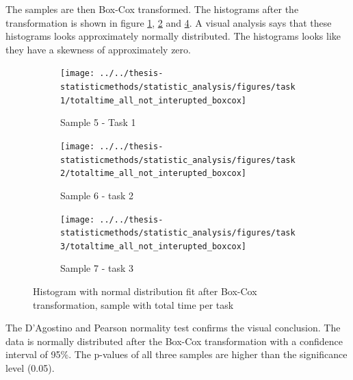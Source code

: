 The samples are then Box-Cox transformed. The histograms after the transformation is shown in figure \ref{fig:totaltimeallnotinteruptedboxcox_task1}, \ref{fig:totaltimeallnotinteruptedboxcox_task2} and \ref{fig:totaltimeallnotinteruptedboxcox_task3}. A visual analysis says that these histograms looks approximately normally distributed. The histograms looks like they have a skewness of approximately zero. 

\begin{figure}[h!]
	\centering
	\begin{subfigure}[b]{0.3\textwidth}
		\centering
		\texttt{[image: ../../thesis-statisticmethods/statistic\_analysis/figures/task1/totaltime\_all\_not\_interupted\_boxcox]}
		\caption{Sample 5 - Task 1}
		\label{fig:totaltimeallnotinteruptedboxcox_task1}
	\end{subfigure}
	\begin{subfigure}[b]{0.3\textwidth}
		\centering
		\texttt{[image: ../../thesis-statisticmethods/statistic\_analysis/figures/task2/totaltime\_all\_not\_interupted\_boxcox]}
		\caption{Sample 6 - task 2}
		\label{fig:totaltimeallnotinteruptedboxcox_task2}
	\end{subfigure}
	\begin{subfigure}[b]{0.3\textwidth}
		\centering
		\texttt{[image: ../../thesis-statisticmethods/statistic\_analysis/figures/task3/totaltime\_all\_not\_interupted\_boxcox]}
		\caption{Sample 7 - task 3}
		\label{fig:totaltimeallnotinteruptedboxcox_task3}
	\end{subfigure}
	\caption{Histogram with normal distribution fit after Box-Cox transformation, sample with total time per task}
\end{figure}

The D'Agostino and Pearson normality test confirms the visual conclusion. The data is normally distributed after the Box-Cox transformation with a confidence interval of 95\%. The p-values of all three samples are higher than the significance level (0.05). \\[0.5cm]

